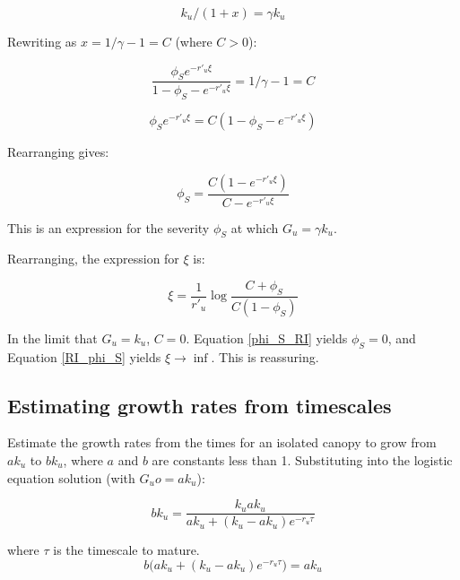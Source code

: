 \documentclass[12pt]{article}
\begin{document}
\begin{equation}
 k_u /(1+x) = \gamma k_u
\end{equation}

Rewriting as  $x = 1/\gamma  - 1= C$ (where $C> 0$):

\begin{equation}
 \frac{ \phi_S  e^{-r'_u \xi}}{1- \phi_S - e^{-r'_u \xi}} =  1/\gamma  - 1 = C
\end{equation}

\begin{equation}
{ \phi_S  e^{-r'_u \xi}} = C ({1- \phi_S - e^{-r'_u \xi}} )
\end{equation}

Rearranging gives:

\begin{equation}
 \phi_S   =  \frac{C(1 - e^{-r'_u \xi})}{C  - e^{-r'_u \xi}} 
 \label{phi_S_RI}
 \end{equation}

This is an expression for the severity $ \phi_S $ at which $G_u = \gamma k_u$.

Rearranging, the expression for $\xi$ is: 


\begin{equation}
\xi   =  \frac{1}{r'_u}\log \frac{C  +\phi_S } {C(1 - \phi_S)}
 \label{RI_phi_S}
 \end{equation}

In the limit that  $G_u = k_u$, $C=0$.
 Equation \ref{phi_S_RI} yields $\phi_S = 0$,  and Equation \ref{RI_phi_S} yields $\xi \rightarrow \inf$.
 This is reassuring.


\subsection*{Estimating growth rates from timescales} 

Estimate the growth rates from the times for an isolated canopy to grow from $a k_u$ to $b k_u$, where $a$ and $b$ are constants less than 1.  
Substituting into the logistic equation solution (with $ G_uo = a k_u$):

\begin{equation}
    b k_u = \frac{k_u  a k_u }{ a k_u +(k_u- a k_u) e^{-r_u \tau}}
\end{equation}

where $\tau$ is the timescale to mature.
\begin{equation}
    b ({ a k_u +(k_u- a k_u) e^{-r_u \tau}) ={ a k_u }}
\end{equation}
\end{document}
